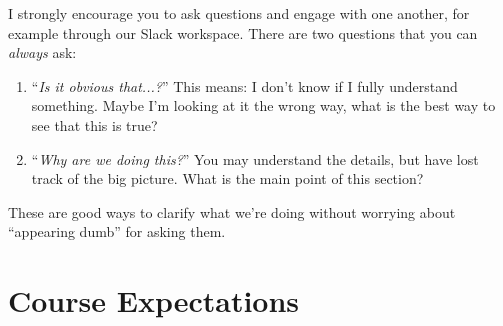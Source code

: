\documentclass[12pt]{article}
\numberwithin{equation}{section}    %
\begin{document}
I strongly encourage you to ask questions and engage with one another, for example through our Slack workspace. There are two questions that you can \emph{always} ask:
\begin{enumerate}
	\item ``\emph{Is it obvious that...?}'' This means: I don't know if I fully understand something. Maybe I'm looking at it the wrong way, what is the best way to see that this is true? 
	\item ``\emph{Why are we doing this?}'' You may understand the details, but have lost track of the big picture. What is the main point of this section?
\end{enumerate}
These are good ways to clarify what we're doing without worrying about ``appearing dumb'' for asking them.

\section*{Course Expectations}
\end{document}
